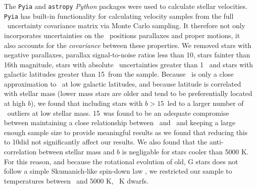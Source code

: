The {\tt Pyia} \citep{price-whelan_2018} and {\tt astropy} \citep{astropy2013,
astropy2018} {\it Python} packages were used to calculate stellar velocities.
{\tt Pyia} has built-in functionality for calculating velocity samples from
the full \gaia\ uncertainty covariance matrix via Monte Carlo sampling.
It therefore not only incorporates uncertainties on the \gaia\ positions
parallaxes and proper motions, it also accounts for the {\it covariance}
between these properties.
We removed stars with negative parallaxes, parallax signal-to-noise ratios
less than 10, stars fainter than 16th magnitude, stars with absolute \vb\
uncertainties greater than 1 \kms\, and stars with galactic latitudes greater
than 15\degrees\ from the sample.
Because \vb\ is only a close approximation to \vz\ at low galactic latitudes,
and because latitude is correlated with stellar mass (lower mass stars are
older and tend to be preferentially located at high $b$), we found that
including stars with $b > 15$\degrees\ led to a larger number of \vb\ outliers
at low stellar mass.
15\degrees\ was found to be an adequate compromise between maintaining a close
relationship between \vb\ and \vz\ and keeping a large enough sample size to
provide meaningful results as we found that reducing this to 10\degrees did
not significantly affect our results.
We also found that the anti-correlation between stellar mass and $b$ is
negligable for stars cooler than 5000 K.
For this reason, and because the rotational evolution of old, G stars does not
follow a simple Skumanich-like spin-down law \citep{vansaders2016}, we
restricted our sample to temperatures between \tmin\ and 5000 K, \ie\ K
dwarfs.

